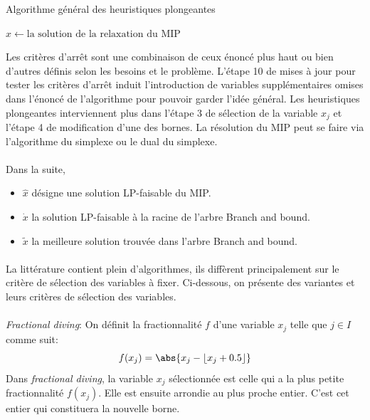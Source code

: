 \documentclass[12pt,a4paper,oneside]{book}
\theoremstyle{definition}
\DeclarePairedDelimiter\ceil{\lceil}{\rceil}
\DeclarePairedDelimiter\floor{\lfloor}{\rfloor}
\begin{document}
	\begin{algorithm}
		\caption{Algorithme général des heuristiques plongeantes}
		\SetAlgoLined
		\DontPrintSemicolon
		
		$\hat{x} \gets \text{la solution de la relaxation du MIP} $\;
		
	\end{algorithm}

	Les critères d'arrêt sont une combinaison de ceux énoncé plus haut ou bien d'autres définis selon les besoins et le problème. L'étape 10 de mises à jour pour tester les critères d'arrêt induit l'introduction de variables supplémentaires omises dans l'énoncé de l'algorithme pour pouvoir garder l'idée général. Les heuristiques plongeantes interviennent plus dans l'étape 3 de sélection de la variable $x_j$ et l'étape 4 de modification d'une des bornes. La résolution du MIP peut se faire via l'algorithme du simplexe ou le dual du simplexe. 
	
	\paragraph{}
	Dans la suite, 
	\begin{itemize}
		\item $\hat{x}$ désigne une solution LP-faisable du MIP. 
		\item $\dot{x}$ la solution LP-faisable à la racine de l'arbre Branch and bound.
		\item $\tilde{x}$ la meilleure solution trouvée dans l'arbre Branch and bound.
	\end{itemize}
	

	\paragraph{}
	La littérature contient plein d'algorithmes, ils diffèrent principalement sur le critère de sélection des variables à fixer. Ci-dessous, on présente des variantes et leurs critères de sélection des variables.
	\paragraph{}
	\textit{Fractional diving}: On définit la fractionnalité $f$ d'une variable $x_j$ telle que $j \in I$ comme suit:
	\[
		f(x_j) = \abs{x_j - \floor{x_j+0.5}}
	\]
	Dans \textit{fractional diving}, la variable $x_j$ sélectionnée est celle qui a la plus petite fractionnalité $f(x_j)$. Elle est ensuite arrondie au plus proche entier. C'est cet entier qui constituera la nouvelle borne.
\end{document}
